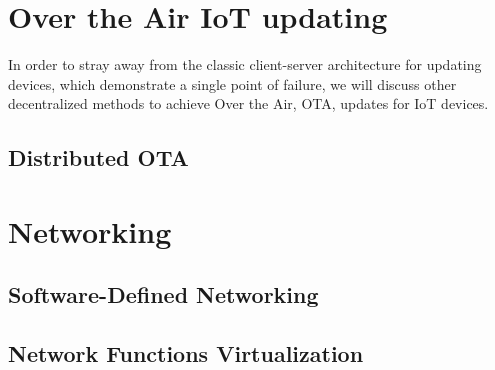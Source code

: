 
\section{Over the Air IoT updating} %
\label{sec:Over the Air  IoT updating}
In order to stray away from the classic client-server architecture for updating devices, which demonstrate a single
point of failure, we will discuss other decentralized methods to achieve Over the Air, OTA, updates for IoT devices.

\subsection{Distributed OTA} %
\label{sub:Distributed OTA}


\section{Networking} %
\label{sec:Networking}
\subsection{Software-Defined Networking} %
\label{sub:Software-Defined Networking}


\subsection{Network Functions Virtualization} %
\label{sub:Network Functions Virtualization}

